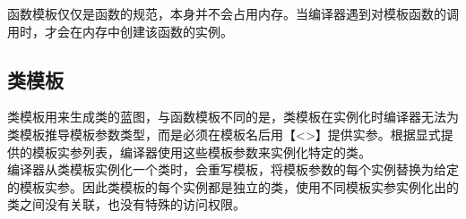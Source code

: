 函数模板仅仅是函数的规范，本身并不会占用内存。当编译器遇到对模板函数的调用时，才会在内存中创建该函数的实例。\\

\subsection{类模板}

类模板用来生成类的蓝图，与函数模板不同的是，类模板在实例化时编译器无法为类模板推导模板参数类型，而是必须在模板名后用【<>】提供实参。根据显式提供的模板实参列表，编译器使用这些模板参数来实例化特定的类。\\

编译器从类模板实例化一个类时，会重写模板，将模板参数的每个实例替换为给定的模板实参。因此类模板的每个实例都是独立的类，使用不同模板实参实例化出的类之间没有关联，也没有特殊的访问权限。\\


